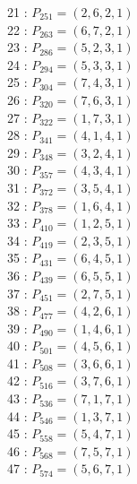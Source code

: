 \documentclass{article}
\begin{document}
{\begin{multicols}{2}
21 : $P_{251}=( 2, 6, 2, 1 )$\\
22 : $P_{263}=( 6, 7, 2, 1 )$\\
23 : $P_{286}=( 5, 2, 3, 1 )$\\
24 : $P_{294}=( 5, 3, 3, 1 )$\\
25 : $P_{304}=( 7, 4, 3, 1 )$\\
26 : $P_{320}=( 7, 6, 3, 1 )$\\
27 : $P_{322}=( 1, 7, 3, 1 )$\\
28 : $P_{341}=( 4, 1, 4, 1 )$\\
29 : $P_{348}=( 3, 2, 4, 1 )$\\
30 : $P_{357}=( 4, 3, 4, 1 )$\\
31 : $P_{372}=( 3, 5, 4, 1 )$\\
32 : $P_{378}=( 1, 6, 4, 1 )$\\
33 : $P_{410}=( 1, 2, 5, 1 )$\\
34 : $P_{419}=( 2, 3, 5, 1 )$\\
35 : $P_{431}=( 6, 4, 5, 1 )$\\
36 : $P_{439}=( 6, 5, 5, 1 )$\\
37 : $P_{451}=( 2, 7, 5, 1 )$\\
38 : $P_{477}=( 4, 2, 6, 1 )$\\
39 : $P_{490}=( 1, 4, 6, 1 )$\\
40 : $P_{501}=( 4, 5, 6, 1 )$\\
41 : $P_{508}=( 3, 6, 6, 1 )$\\
42 : $P_{516}=( 3, 7, 6, 1 )$\\
43 : $P_{536}=( 7, 1, 7, 1 )$\\
44 : $P_{546}=( 1, 3, 7, 1 )$\\
45 : $P_{558}=( 5, 4, 7, 1 )$\\
46 : $P_{568}=( 7, 5, 7, 1 )$\\
47 : $P_{574}=( 5, 6, 7, 1 )$\\
\end{multicols}
}
\end{document}
